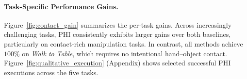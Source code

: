 \documentclass{article} %
\begin{document}
\paragraph{Task-Specific Performance Gains.}
Figure~\ref{fig:contact_gain} summarizes the per-task gains. Across increasingly challenging tasks, PHI consistently exhibits larger gains over both baselines, particularly on contact-rich manipulation tasks. In contrast, all methods achieve $100\%$ on \textit{Walk to Table}, which requires no intentional hand–object contact. Figure~\ref{fig:qualitative_execution} (Appendix) shows selected successful PHI executions across the five tasks.


\end{document}
